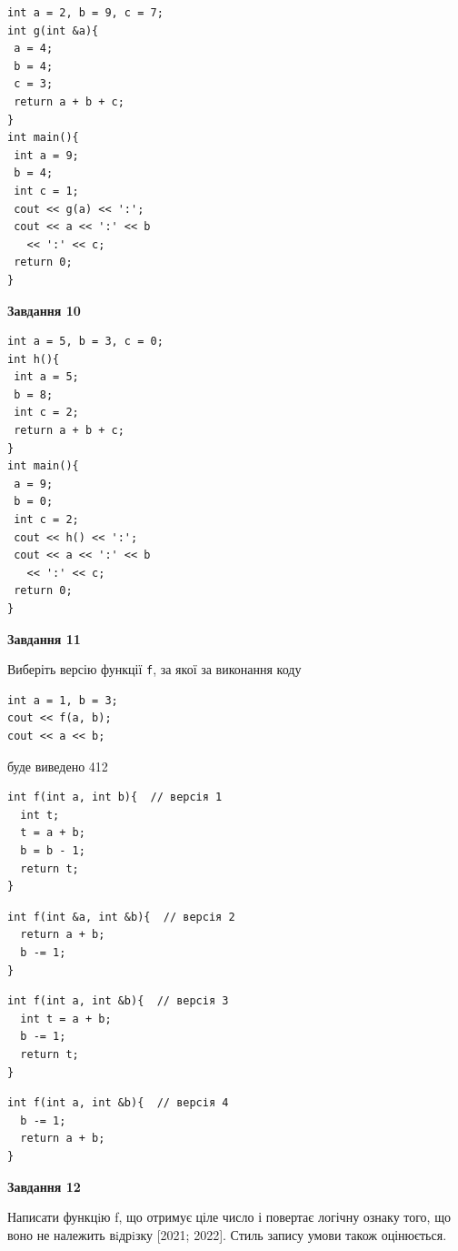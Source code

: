 \documentclass[12pt, ukrainian]{article}
\def\code#1{\Verb!#1!}
\begin{document}
{\begin {large}
\begin{minipage}[t]{7.0cm}
\begin{verbatim}
int a = 2, b = 9, c = 7;
int g(int &a){
 a = 4;
 b = 4;
 c = 3;
 return a + b + c;
}
int main(){
 int a = 9;
 b = 4;
 int c = 1;
 cout << g(a) << ':';
 cout << a << ':' << b 
   << ':' << c;
 return 0;
}
\end{verbatim}



\begin{center}
\textbf{Завдання 10}
\end{center}
\vspace{-8mm}

\begin{verbatim}
int a = 5, b = 3, c = 0;
int h(){
 int a = 5;
 b = 8;
 int c = 2;
 return a + b + c;
}
int main(){
 a = 9;
 b = 0;
 int c = 2;
 cout << h() << ':';
 cout << a << ':' << b 
   << ':' << c;
 return 0;
}
\end{verbatim}

\end{minipage}
\vline \hspace{1mm}
\begin{minipage}[t]{11.0cm}

\begin{center}
\textbf{Завдання 11}
\end{center}
Виберіть версію функції \code{f}, за якої за виконання коду
\begin{verbatim}
int a = 1, b = 3;
cout << f(a, b);
cout << a << b;
\end{verbatim}

буде виведено 412

\begin{verbatim}
int f(int a, int b){  // версія 1
  int t;
  t = a + b;
  b = b - 1;
  return t;
}
\end{verbatim}

\vspace{-8mm}\begin{verbatim}
int f(int &a, int &b){  // версія 2
  return a + b;
  b -= 1;
}
\end{verbatim}

\vspace{-8mm}\begin{verbatim}
int f(int a, int &b){  // версія 3
  int t = a + b;
  b -= 1;
  return t;
}
\end{verbatim}

\vspace{-8mm}\begin{verbatim}
int f(int a, int &b){  // версія 4
  b -= 1;
  return a + b;
}
\end{verbatim}



\begin{center}
\textbf{Завдання 12}
\end{center}

Написати функцiю f, що отримує ціле число і повертає логічну ознаку того, що воно не належить вiдрiзку [2021; 2022]. Стиль запису умови також оцінюється.\par

\end{minipage}

\end {large}}
\end{document}
